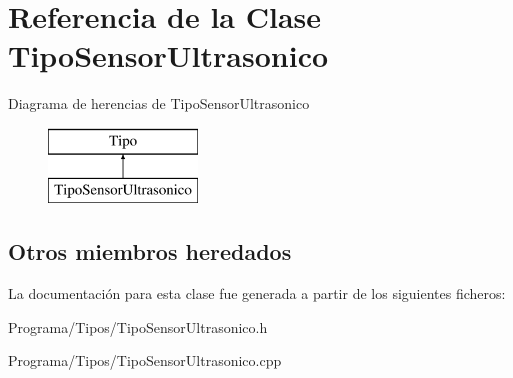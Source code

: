 \hypertarget{class_tipo_sensor_ultrasonico}{\section{Referencia de la Clase Tipo\-Sensor\-Ultrasonico}
\label{class_tipo_sensor_ultrasonico}
}
Diagrama de herencias de Tipo\-Sensor\-Ultrasonico\begin{figure}[H]
\begin{center}
\leavevmode
\includegraphics[height=2.000000cm]{class_tipo_sensor_ultrasonico}
\end{center}
\end{figure}
\subsection*{Otros miembros heredados}


La documentación para esta clase fue generada a partir de los siguientes ficheros\-:\begin{DoxyCompactItemize}
\item 
Programa/\-Tipos/Tipo\-Sensor\-Ultrasonico.\-h\item 
Programa/\-Tipos/Tipo\-Sensor\-Ultrasonico.\-cpp\end{DoxyCompactItemize}
